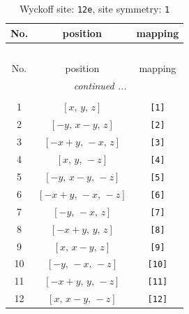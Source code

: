\documentclass[fleqn,8pt]{jsarticle}
\begin{document}
\begin{longtable}{ccc}
\caption{Wyckoff site: {\tt 12e}, site symmetry: {\tt 1}}
 \\
 \hline \hline
No. & position & mapping \\ \hline \endfirsthead

\multicolumn{2}{l}{\tablename\ \thetable{}} \\
 \hline \hline
No. & position & mapping \\ \hline \endhead

 \hline \hline
\multicolumn{2}{r}{\footnotesize\it continued ...} \\ \endfoot

 \hline \hline
\multicolumn{2}{r}{} \\ \endlastfoot

1 & $\left[ x,\, y,\, z \right]$ & {\tt [1]} \\ \hline
2 & $\left[ - y,\, x - y,\, z \right]$ & {\tt [2]} \\ \hline
3 & $\left[ - x + y,\, - x,\, z \right]$ & {\tt [3]} \\ \hline
4 & $\left[ x,\, y,\, - z \right]$ & {\tt [4]} \\ \hline
5 & $\left[ - y,\, x - y,\, - z \right]$ & {\tt [5]} \\ \hline
6 & $\left[ - x + y,\, - x,\, - z \right]$ & {\tt [6]} \\ \hline
7 & $\left[ - y,\, - x,\, z \right]$ & {\tt [7]} \\ \hline
8 & $\left[ - x + y,\, y,\, z \right]$ & {\tt [8]} \\ \hline
9 & $\left[ x,\, x - y,\, z \right]$ & {\tt [9]} \\ \hline
10 & $\left[ - y,\, - x,\, - z \right]$ & {\tt [10]} \\ \hline
11 & $\left[ - x + y,\, y,\, - z \right]$ & {\tt [11]} \\ \hline
12 & $\left[ x,\, x - y,\, - z \right]$ & {\tt [12]} \\
\end{longtable}
\end{document}
